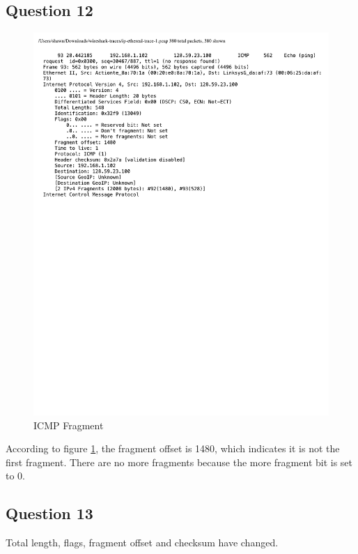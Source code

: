 \documentclass[titlepage, paper=a4, fontsize=11pt]{scrartcl} %
\numberwithin{equation}{section} %
\numberwithin{figure}{section} %
\numberwithin{table}{section} %
\begin{document}
\subsection*{Question 12}
\begin{figure}[!ht]
    \centering
    \includegraphics[width=\textwidth]{images/lab2-q12.pdf}
    \caption{ICMP Fragment}
    \label{fig:ip-fragment}
\end{figure}
According to figure \ref{fig:ip-fragment}, the fragment offset is 1480, which indicates it is not the first fragment. There are no more fragments because the more fragment bit is set to 0. \\

\subsection*{Question 13}
Total length, flags, fragment offset and checksum have changed. \\
\end{document}
